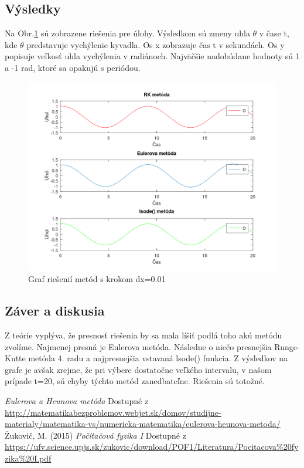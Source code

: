\documentclass{article}
\theoremstyle{definition}
\theoremstyle{remark}
\begin{document}
\subsection{Výsledky}
Na Obr.\ref{fig:dx001} sú zobrazene riešenia pre úlohy. Výsledkom sú zmeny uhla $\theta$ v čase t, kde $\theta$ predstavuje vychýlenie kyvadla. Os x zobrazuje čas t v sekundách. Os y popisuje veľkosť uhla vychýlenia v radiánoch. Najväčšie nadobúdane hodnoty sú 1 a -1 rad, ktoré sa opakujú s periódou. 
\begin{figure}[H]
  \centering
  \includegraphics[width=1\textwidth]{graph_hw2.png}
  \caption{Graf riešenií metód s krokom dx=0.01}
  \label{fig:dx001}
\end{figure}





\subsection{Záver a diskusia}

Z teórie vyplýva, že presnosť riešenia by sa mala líšiť podlá toho akú metódu zvolíme. Najmenej presná je Eulerova metóda. Následne o niečo presnejšia Runge-Kutte metóda 4. radu a najpresnejšia vstavaná lsode() funkcia. Z výsledkov na grafe je avšak zrejme, že pri výbere dostatočne veľkého intervalu, v našom prípade t=20, sú chyby týchto metód zanedbateľne. Riešenia sú totožné.

\pagebreak
\begin{thebibliography}{99}
 \emph{Eulerova a Heunova metóda} Dostupné z \url{http://matematikabezproblemov.webjet.sk/domov/studijne-materialy/matematika-vs/numericka-matematika/eulerova-heunova-metoda/}
Žukovič, M. (2015) \emph{Počítačová fyzika I} Dostupné z \url{https://ufv.science.upjs.sk/zukovic/download/POF1/Literatura/Pocitacova%20fyzika%20I.pdf}
\end{thebibliography}
\end{document}

